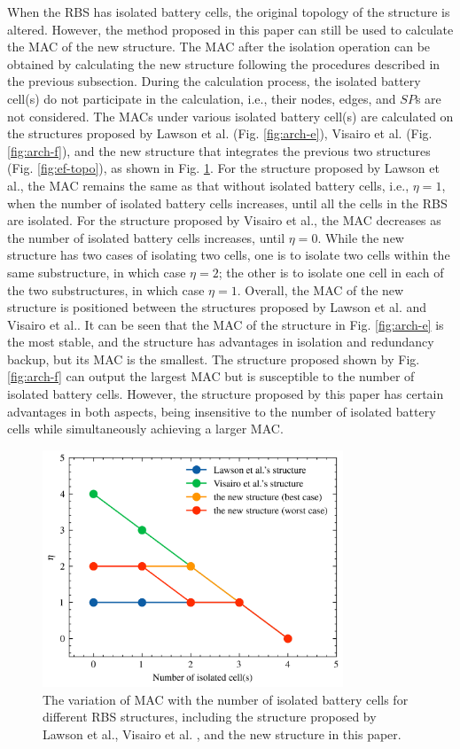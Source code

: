 \documentclass{article}
\begin{document}
When the RBS has isolated battery cells, the original topology of the structure is altered. 
However, the method proposed in this paper can still be used to calculate the MAC of the new structure. 
The MAC after the isolation operation can be obtained by calculating the new structure following the procedures described in the previous subsection.
During the calculation process, the isolated battery cell(s) do not participate in the calculation, i.e., their nodes, edges, and $SP$s are not considered. 
The MACs under various isolated battery cell(s) are calculated on the structures proposed by Lawson et al. (Fig. \ref{fig:arch-e}), Visairo et al. (Fig. \ref{fig:arch-f}), and the new structure that integrates the previous two structures (Fig. \ref{fig:ef-topo}), as shown in Fig. \ref{fig:isolated_mac}. 
For the structure proposed by Lawson et al., the MAC remains the same as that without isolated battery cells, i.e., $\eta=1$, when the number of isolated battery cells increases, until all the cells in the RBS are isolated.
For the structure proposed by Visairo et al., the MAC decreases as the number of isolated battery cells increases, until $\eta=0$.
While the new structure has two cases of isolating two cells, one is to isolate two cells within the same substructure, in which case $\eta=2$; the other is to isolate one cell in each of the two substructures, in which case $\eta=1$. 
Overall, the MAC of the new structure is positioned between the structures proposed by Lawson et al. and Visairo et al..
It can be seen that the MAC of the structure in Fig. \ref{fig:arch-e} is the most stable, and the structure has advantages in isolation and redundancy backup, but its MAC is the smallest. 
The structure proposed shown by Fig. \ref{fig:arch-f} can output the largest MAC but is susceptible to the number of isolated battery cells. 
However, the structure proposed by this paper has certain advantages in both aspects, being insensitive to the number of isolated battery cells while simultaneously achieving a larger MAC.

\begin{figure}[htbp]
    \centering
    \includegraphics[width=0.8\textwidth]{../attachments/isolated_mac.png}
    \caption{
        The variation of MAC with the number of isolated battery cells for different RBS structures, including the structure proposed by Lawson et al., Visairo et al. , and the new structure in this paper.
    }\label{fig:isolated_mac}
\end{figure}
\end{document}
